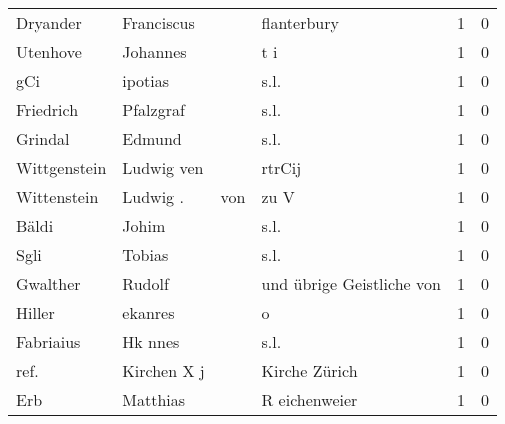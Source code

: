 \documentclass[10pt,a4paper,landscape]{article}
\begin{document}
\begin{longtable}{llllrr}
                 Dryander &                         Franciscus &             &                                 flanterbury &          1 &         0 \\
                 Utenhove &                           Johannes &             &                                         t i &          1 &         0 \\
                      gCi &                            ipotias &             &                                        s.l. &          1 &         0 \\
                Friedrich &                          Pfalzgraf &             &                                        s.l. &          1 &         0 \\
                  Grindal &                             Edmund &             &                                        s.l. &          1 &         0 \\
             Wittgenstein &                         Ludwig ven &             &                                      rtrCij &          1 &         0 \\
              Wittenstein &                           Ludwig . &         von &                                        zu V &          1 &         0 \\
                    Bäldi &                              Johim &             &                                        s.l. &          1 &         0 \\
                     Sgli &                             Tobias &             &                                        s.l. &          1 &         0 \\
                 Gwalther &                             Rudolf &             &                   und übrige Geistliche von &          1 &         0 \\
                   Hiller &                            ekanres &             &                                           o &          1 &         0 \\
                Fabriaius &                            Hk nnes &             &                                        s.l. &          1 &         0 \\
                     ref. &                        Kirchen X j &             &                               Kirche Zürich &          1 &         0 \\
                      Erb &                           Matthias &             &                               R eichenweier &          1 &         0 \\

\end{longtable}
\end{document}
